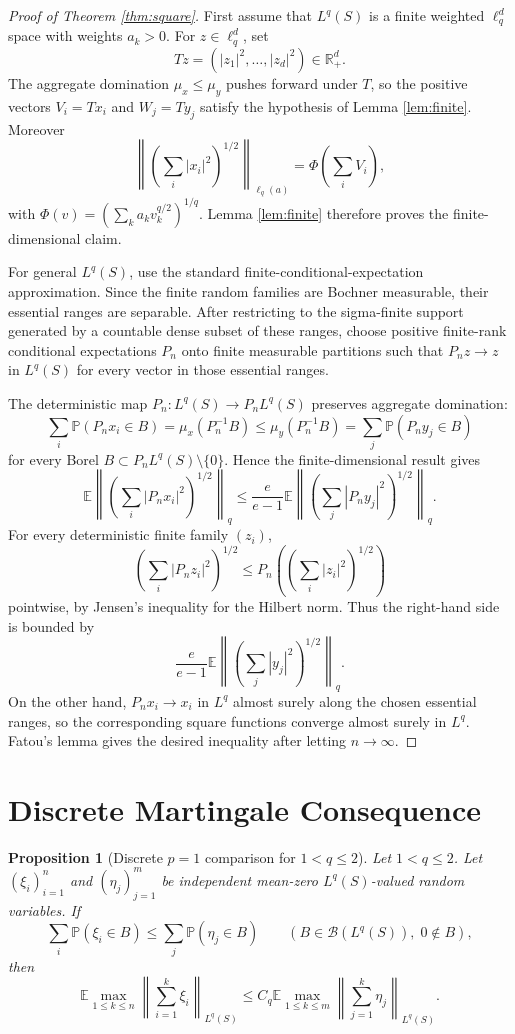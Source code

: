 \documentclass[11pt]{article}
\newtheorem{proposition}{Proposition}
\newcommand{\E}{\mathbb E}
\newcommand{\Pp}{\mathbb P}
\newcommand{\R}{\mathbb R}
\newcommand{\cB}{\mathcal B}
\newcommand{\Lq}{L^q(S)}
\begin{document}
\begin{proof}[Proof of Theorem \ref{thm:square}]
First assume that \(L^q(S)\) is a finite weighted \(\ell_q^d\) space with
weights \(a_k>0\).  For \(z\in\ell_q^d\), set
\[
  Tz=(|z_1|^2,\ldots,|z_d|^2)\in\R_+^d.
\]
The aggregate domination \(\mu_x\le\mu_y\) pushes forward under \(T\), so the
positive vectors \(V_i=T x_i\) and \(W_j=T y_j\) satisfy the hypothesis of
Lemma \ref{lem:finite}.  Moreover
\[
  \left\|
      \left(\sum_i |x_i|^2\right)^{1/2}
  \right\|_{\ell_q(a)}
  =
  \Phi\left(\sum_i V_i\right),
\]
with \(\Phi(v)=(\sum_k a_k v_k^{q/2})^{1/q}\).  Lemma \ref{lem:finite}
therefore proves the finite-dimensional claim.

For general \(L^q(S)\), use the standard finite-conditional-expectation
approximation.  Since the finite random families are Bochner measurable, their
essential ranges are separable.  After restricting to the sigma-finite
support generated by a countable dense subset of these ranges, choose positive
finite-rank conditional expectations \(P_n\) onto finite measurable
partitions such that \(P_n z\to z\) in \(L^q(S)\) for every vector in those
essential ranges.

The deterministic map \(P_n:L^q(S)\to P_nL^q(S)\) preserves aggregate
domination:
\[
  \sum_i\Pp(P_nx_i\in B)
  =
  \mu_x(P_n^{-1}B)
  \le
  \mu_y(P_n^{-1}B)
  =
  \sum_j\Pp(P_ny_j\in B)
\]
for every Borel \(B\subset P_nL^q(S)\setminus\{0\}\).  Hence the
finite-dimensional result gives
\[
  \E\left\|
      \left(\sum_i |P_nx_i|^2\right)^{1/2}
    \right\|_q
  \le
  \frac{e}{e-1}
  \E\left\|
      \left(\sum_j |P_ny_j|^2\right)^{1/2}
    \right\|_q.
\]
For every deterministic finite family \((z_i)\),
\[
  \left(\sum_i |P_nz_i|^2\right)^{1/2}
  \le
  P_n\left(\left(\sum_i |z_i|^2\right)^{1/2}\right)
\]
pointwise, by Jensen's inequality for the Hilbert norm.  Thus the right-hand
side is bounded by
\[
  \frac{e}{e-1}
  \E\left\|
      \left(\sum_j |y_j|^2\right)^{1/2}
    \right\|_q.
\]
On the other hand, \(P_nx_i\to x_i\) in \(L^q\) almost surely along the chosen
essential ranges, so the corresponding square functions converge almost
surely in \(L^q\).  Fatou's lemma gives the desired inequality after letting
\(n\to\infty\).
\end{proof}

\section*{Discrete Martingale Consequence}

\begin{proposition}[Discrete \(p=1\) comparison for \(1<q\le2\)]
\label{prop:discrete}
Let \(1<q\le2\).  Let \((\xi_i)_{i=1}^n\) and \((\eta_j)_{j=1}^m\) be
independent mean-zero \(L^q(S)\)-valued random variables.  If
\[
   \sum_i \Pp(\xi_i\in B)
   \le
   \sum_j \Pp(\eta_j\in B)
   \qquad(B\in\cB(\Lq),\;0\notin B),
\]
then
\[
   \E\max_{1\le k\le n}
      \left\|\sum_{i=1}^k \xi_i\right\|_{L^q(S)}
   \le
   C_q
   \E\max_{1\le k\le m}
      \left\|\sum_{j=1}^k \eta_j\right\|_{L^q(S)}.
\]
\end{proposition}
\end{document}

